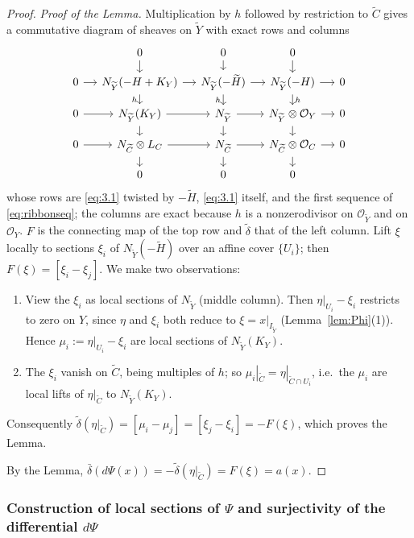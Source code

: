 \documentclass[11pt,twoside]{amsart}
\theoremstyle{plain}
\theoremstyle{definition}
\newcommand{\OO}{\mathcal{O}}
\newcommand{\Yt}{\widetilde{Y}}
\newcommand{\Ht}{\widetilde{H}}
\newcommand{\Ct}{\widetilde{C}}
\newcommand{\NYt}{N_{\Yt}}
\begin{document}
\begin{proof}
\emph{Proof of the Lemma.} Multiplication by $h$ followed by restriction to $\Ct$ gives a commutative diagram of sheaves on $\Yt$ with exact rows and columns
\begin{equation}\label{diag:3x3}
\begin{tikzcd}[row sep=small, column sep=small]
& 0\arrow[d] & 0\arrow[d] & 0\arrow[d] & \\
0\arrow[r] & \NYt(-H+K_Y)\arrow[r]\arrow[d,"h"'] & \NYt(-\Ht)\arrow[r]\arrow[d,"h"'] & \NYt(-H)\arrow[r]\arrow[d,"h"] & 0\\
0\arrow[r] & \NYt(K_Y)\arrow[r]\arrow[d] & \NYt\arrow[r]\arrow[d] & \NYt\otimes\OO_Y\arrow[r]\arrow[d] & 0\\
0\arrow[r] & N_{\Ct}\otimes L_C\arrow[r]\arrow[d] & N_{\Ct}\arrow[r]\arrow[d] & N_{\Ct}\otimes\OO_C\arrow[r]\arrow[d] & 0\\
& 0 & 0 & 0 &
\end{tikzcd}
\end{equation}
whose rows are \eqref{eq:3.1} twisted by $-\Ht$, \eqref{eq:3.1} itself, and the first sequence of \eqref{eq:ribbonseq}; the columns are exact because $h$ is a nonzerodivisor on $\OO_{\Yt}$ and on $\OO_Y$. $F$ is the connecting map of the top row and $\tilde\delta$ that of the left column. Lift $\xi$ locally to sections $\xi_i$ of $\NYt(-\Ht)$ over an affine cover $\{U_i\}$; then $F(\xi)=[\xi_i-\xi_j]$. We make two observations:
\begin{enumerate}
\item[(a)] View the $\xi_i$ as local sections of $\NYt$ (middle column). Then $\eta|_{U_i}-\xi_i$ restricts to zero on $Y$, since $\eta$ and $\xi_i$ both reduce to $\xi=x|_{I_{\Yt}}$ (Lemma~\ref{lem:Phi}(1)). Hence $\mu_i:=\eta|_{U_i}-\xi_i$ are local sections of $\NYt(K_Y)$.
\item[(b)] The $\xi_i$ vanish on $\Ct$, being multiples of $h$; so $\mu_i|_{\Ct}=\eta|_{\Ct\cap U_i}$, i.e.\ the $\mu_i$ are local lifts of $\eta|_{\Ct}$ to $\NYt(K_Y)$.
\end{enumerate}
Consequently $\tilde\delta(\eta|_{\Ct})=[\mu_i-\mu_j]=[\xi_j-\xi_i]=-F(\xi)$, which proves the Lemma.

By the Lemma, $\bar\delta(d\Psi(x))=-\tilde\delta(\eta|_{\Ct})=F(\xi)=a(x)$.
\end{proof}

\subsubsection{Construction of local sections of \texorpdfstring{$\Psi$}{Psi} and surjectivity of the differential \texorpdfstring{$d\Psi$}{dPsi}}\label{subsec:sections}
\end{document}
